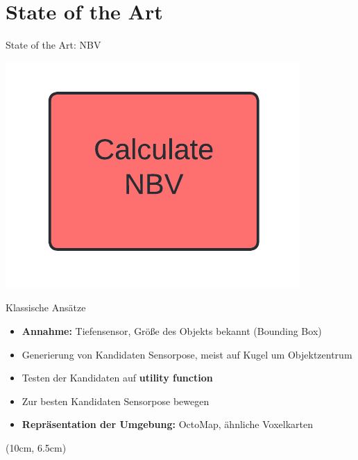 \documentclass{beamer}
\begin{document}
\section{State of the Art}
\begin{frame}{State of the Art: NBV}
	\vspace{-1cm}
	\hfill
	\begin{minipage}{0.2\textwidth}
		\includegraphics[width=\textwidth]{Graphics/nbv_flow.png}
	\end{minipage}
	\vspace{-0.5cm}
	\begin{block}{Klassische Ansätze}
		\begin{itemize}
			\item \textbf{Annahme:} Tiefensensor, Größe des Objekts bekannt (Bounding Box)
			\item Generierung von Kandidaten Sensorpose, meist auf Kugel um Objektzentrum
			\item Testen der Kandidaten auf \textbf{utility function}
			\item Zur besten Kandidaten Sensorpose bewegen
			\item \textbf{Repräsentation der Umgebung:} OctoMap, ähnliche Voxelkarten
		\end{itemize}
		\cite{zeng_view_2020}
	\end{block}
	\begin{textblock*}{0.2\textwidth}(10cm, 6.5cm)

\end{textblock*}
\end{frame}
\end{document}
